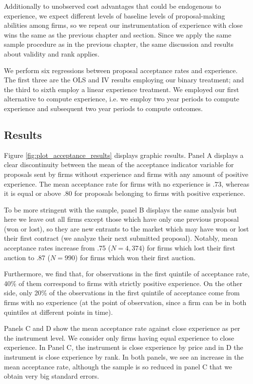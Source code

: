 Additionally to unobserved cost advantages that could be endogenous to experience, we expect different levels of baseline levels of proposal-making abilities among firms, so we repeat our instrumentation of experience with close wins the same as the previous chapter and section. Since we apply the same sample procedure as in the previous chapter, the same discussion and results about validity and rank applies.

We perform six regressions between proposal acceptance rates and experience. The first three are the OLS and IV results employing our binary treatment; and the third to sixth employ a linear experience treatment. We employed our first alternative to compute experience, i.e. we employ two year periods to compute experience and subsequent two year periods to compute outcomes.

\subsection{Results}
Figure \ref{fig:plot_acceptance_results} displays graphic results. Panel A displays a clear discontinuity between the mean of the acceptance indicator variable for proposals sent by firms without experience and firms with any amount of positive experience. The mean acceptance rate for firms with no experience is .73, whereas it is equal or above .80 for proposals belonging to firms with positive experience.

To be more stringent with the sample, panel B displays the same analysis but here we leave out all firms except those which have only one previous proposal (won or lost), so they are new entrants to the market which may have won or lost their first contract (we analyze their next submitted proposal).  Notably, mean acceptance rates increase from .75 ($N=4,374$) for firms which lost their first auction to .87 ($N=990$) for firms which won their first auction.

Furthermore, we find that, for observations in the first quintile of acceptance rate, 40\% of them correspond to firms with strictly positive experience. On the other side, only 20\% of the observations in the first quintile of acceptance come from firms with no experience (at the point of observation, since a firm can be in both quintiles at different points in time).

Panels C and D show the mean acceptance rate against close experience as per the instrument level. We consider only firms having equal experience to close experience. In Panel C, the instrument is close experience by price and in D the instrument is close experience by rank. In both panels, we see an increase in the mean acceptance rate, although the sample is so reduced in panel C that we obtain very big standard errors.

